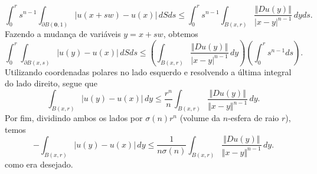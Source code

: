 \documentclass[a4paper, 11pt]{book}
\theoremstyle{definition}
\newcommand{\bz}{\mathbf{0}}
\newcommand{\sint}{-\!\!\!\!\!\!\int}
\begin{document}
\begin{prf}
    \[
        \int_0^r s^{n-1} \int_{\partial B(\bz,1)} |u(x + sw) - u(x)| \,dSds \leqslant \int_0^r s^{n-1} \int_{B(x,r)} \frac{\Vert Du(y) \Vert}{|x-y|^{n-1}} \,dyds.
    \]
    Fazendo a mudança de variáveis $y = x + sw$, obtemos
    \[
        \int_0^r \int_{\partial B(x,s)} |u(y) - u(x)|\, dSds \leqslant \left( \int_{B(x,r)} \frac{\Vert Du(y) \Vert}{|x-y|^{n-1}} \,dy \right) \left( \int_0^r s^{n-1} ds \right).
    \]
    Utilizando coordenadas polares no lado esquerdo e resolvendo a última integral do lado direito, segue que
    \[
        \int_{B(x,r)} |u(y) - u(x)|\,dy \leqslant \frac{r^n}{n} \int_{B(x,r)} \frac{\Vert Du(y) \Vert}{\Vert x - y \Vert^{n-1}} \,dy.
    \]
    Por fim, dividindo ambos os lados por $\sigma(n) r^n$ (volume da $n$-esfera de raio $r$), temos
    \[
        \sint_{B(x,r)} |u(y) - u(x)| \,dy \leqslant \frac{1}{n\sigma(n)} \int_{B(x,r)} \frac{\Vert Du(y) \Vert}{\Vert x-y \Vert^{n-1}} \,dy.
    \]
    como era desejado.


\end{prf}
\end{document}
